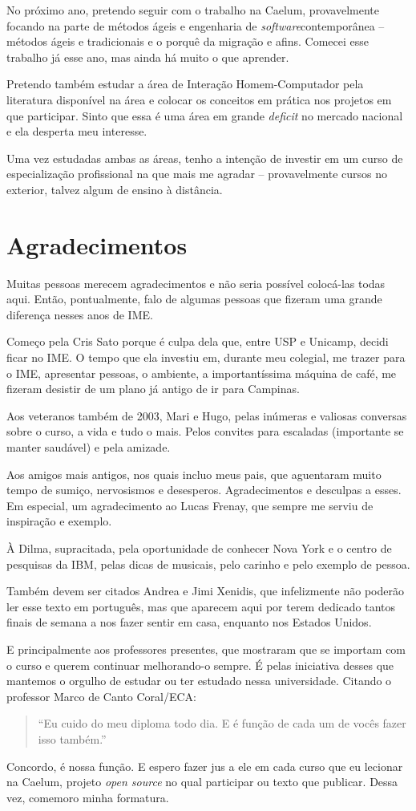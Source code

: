 \documentclass[titlepage,a4paper]{article}
\newcommand{\opensource}{\textit{open source}}
\newcommand{\software}{\textit{software}}
\begin{document}
No próximo ano, pretendo seguir com o trabalho na Caelum, provavelmente focando na parte de métodos ágeis e engenharia de \software contemporânea -- métodos ágeis e tradicionais e o porquê da migração e afins. Comecei esse trabalho já esse ano, mas ainda há muito o que aprender.

Pretendo também estudar a área de Interação Homem-Computador pela literatura disponível na área e colocar os conceitos em prática nos projetos em que participar. Sinto que essa é uma área em grande \textit{deficit} no mercado nacional e ela desperta meu interesse.

Uma vez estudadas ambas as áreas, tenho a intenção de investir em um curso de especialização profissional na que mais me agradar -- provavelmente cursos no exterior, talvez algum de ensino à distância.

\section{Agradecimentos}

Muitas pessoas merecem agradecimentos e não seria possível colocá-las todas aqui. Então, pontualmente, falo de algumas pessoas que fizeram uma grande diferença nesses anos de IME. 

Começo pela Cris Sato porque é culpa dela que, entre USP e Unicamp, decidi ficar no IME. O tempo que ela investiu em, durante meu colegial, me trazer para o IME, apresentar pessoas, o ambiente, a importantíssima máquina de café, me fizeram desistir de um plano já antigo de ir para Campinas.

Aos veteranos também de 2003, Mari e Hugo, pelas inúmeras e valiosas conversas sobre o curso, a vida e tudo o mais. Pelos convites para escaladas (importante se manter saudável) e pela amizade.

Aos amigos mais antigos, nos quais incluo meus pais, que aguentaram muito tempo de sumiço, nervosismos e desesperos. Agradecimentos e desculpas a esses. Em especial, um agradecimento ao Lucas Frenay, que sempre me serviu de inspiração e exemplo.

À Dilma, supracitada, pela oportunidade de conhecer Nova York e o centro de pesquisas da IBM, pelas dicas de musicais, pelo carinho e pelo exemplo de pessoa.

Também devem ser citados Andrea e Jimi Xenidis, que infelizmente não poderão ler esse texto em português, mas que aparecem aqui por terem dedicado tantos finais de semana a nos fazer sentir em casa, enquanto nos Estados Unidos.

E principalmente aos professores presentes, que mostraram que se importam com o curso e querem continuar melhorando-o sempre. É pelas iniciativa desses que mantemos o orgulho de estudar ou ter estudado nessa universidade. Citando o professor Marco de Canto Coral/ECA:

\begin{quote}
	``Eu cuido do meu diploma todo dia. E é função de cada um de vocês fazer isso também.''
\end{quote}

Concordo, é nossa função. E espero fazer jus a ele em cada curso que eu lecionar na Caelum, projeto \opensource{} no qual participar ou texto que publicar. Dessa vez, comemoro minha formatura.
\end{document}
